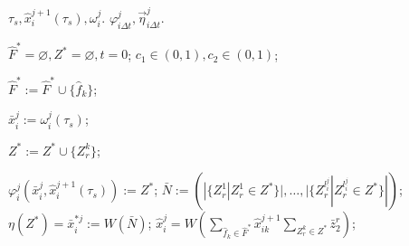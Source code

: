 		\Require $\tau_s, \hat{x}_i^{j+1}(\tau_s), \omega_i^j$.
		\Ensure $\varphi_{i\Delta t}^j, \vec\eta_{i\Delta t}^j$.

		\State $\hat{F}^*=\varnothing,Z^*=\varnothing,t=0$; 
		\State $c_1\in(0,1), c_2\in(0,1)$;

		\Statex {}
				
		 \label{alst:init_start}
			 \label{alst:select_f}
				\State $\hat{F}^*:=\hat{F}^*\cup\{\hat{f}_k\}$;
			\EndIf
		\EndFor
		
		\State $\bar x_i^j:=\omega_i^j(\tau_s)$;
		
				 \label{alst:select_z}
					\State $Z^*:=Z^*\cup\{Z_r^k\}$;
				\EndIf
			\EndFor
		\EndFor
		
		\State $\varphi_i^j(\bar x_i^j,\hat{x}_i^{j+1}(\tau_s)) := Z^*$; \label{alst:init_state}
		\State $\bar N:=(|\{Z_r^1|Z_r^1\in Z^*\}|,\dots,|\{Z_r^{l_i^j}|Z_r^{l_i^j}\in Z^*\}|)$; \label{alst:init_calc_out2}
		\State $\eta(Z^*)=\bar{x}_i^{*j}:=W(\bar N)$; \label{alst:init_calc_out3}
		\State $\hat x_i^j=W(\sum_{\hat f_k\in\hat F^*}\hat x_{ik}^{j+1}\sum_{Z_r^k\in Z^*}\bar z_2^r)$;\label{alst:init_control}
		\label{alst:init_end}